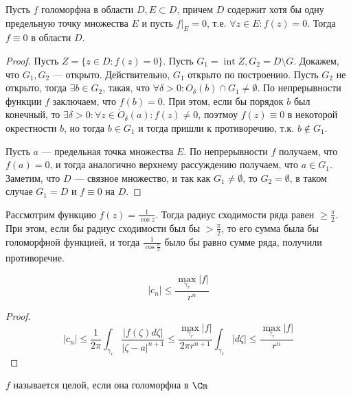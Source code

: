 \begin{theorem}[Единственности]
    Пусть \(f\) голоморфна в области \(D, E \subset D\), причем \(D\) содержит хотя бы одну предельную точку множества \(E\) и пусть \(f|_E = 0\), т.е. \(\forall z \in E: f(z) = 0\). Тогда \(f \equiv 0\) в области \(D\).
\end{theorem}
\begin{proof}
    Пусть \(Z = \{z \in D: f(z) = 0\}\). Пусть \(G_1 = \operatorname{int} Z, G_2 = D \setminus G\). Докажем, что \(G_1, G_2\) --- открыто. Действительно, \(G_1\) открыто по построению. Пусть \(G_2\) не открыто, тогда \(\exists b \in G_2\), такая, что \(\forall \delta > 0: O_\delta(b) \cap G_1 \ne \emptyset\). По непрерывности функции \(f\) заключаем, что \(f(b) = 0\). При этом, если бы порядок \(b\) был конечный, то \(\exists \delta > 0: \forall z \in \dot O_\delta(a): f(z) \ne 0\), поэтмоу \(f(z) \equiv 0\) в некоторой окрестности \(b\), но тогда \(b \in G_1\) и тогда пришли к противоречию, т.к. \(b \notin G_1\).

    Пусть \(a\) --- предельная точка множества \(E\). По непрерывности \(f\) получаем, что \(f(a) = 0\), и тогда аналогично верхнему рассуждению получаем, что \(a \in G_1\). Заметим, что \(D\) --- связное множество, и так как \(G_1 \ne \emptyset\), то \(G_2 = \emptyset\), в таком случае \(G_1 = D\) и \(f \equiv 0\) на \(D\).
\end{proof}

\begin{example}
    Рассмотрим функцию \(f(z) = \frac{1}{\cos z}\). Тогда радиус сходимости ряда равен \(\ge \frac{\pi}{2}\). При этом, если бы радиус сходимости был бы \(> \frac{\pi}{2}\), то его сумма была бы голоморфной функцией, и тогда \(\frac{1}{\cos \frac{\pi}{2}}\) было бы равно сумме ряда, получили противоречие.
\end{example}

\begin{proposition}
    \[|c_n| \le \frac{\max_{\gamma_r} |f|}{r^n}\]
\end{proposition}
\begin{proof}
    \[|c_n| \le \frac{1}{2\pi} \int_{\gamma_r}\frac{|f(\zeta)d\zeta|}{|\zeta - a|^{n + 1}} \le \frac{\max_{\gamma_r}|f|}{2\pi r^{n + 1}}\int_{\gamma_r}|d\zeta| \le \frac{\max_{\gamma_r} |f|}{r^n}\]
\end{proof}

\begin{definition}
    \(f\) называется целой, если она голоморфна в \(\Cm\)
\end{definition}

